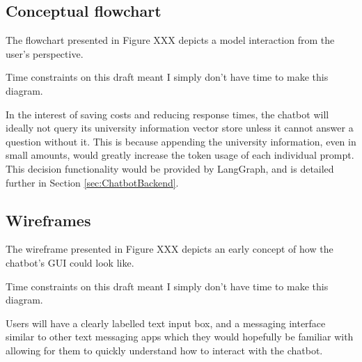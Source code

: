 



\subsection{Conceptual flowchart}
The flowchart presented in Figure XXX depicts a model interaction from the user's perspective.

\begin{tcolorbox}[colback=red!5!white,colframe=red!75!black,title=Not present in draft]
    Time constraints on this draft meant I simply don't have time to make this diagram.
\end{tcolorbox}

\noindent In the interest of saving costs and reducing response times, the chatbot will ideally not query its university information vector store 
unless it cannot answer a question without it. This is because appending the university information, even in small amounts, would 
greatly increase the token usage of each individual prompt. This decision functionality would be provided by LangGraph, and is detailed 
further in Section \ref{sec:ChatbotBackend}.

\subsection{Wireframes}
The wireframe presented in Figure XXX depicts an early concept of how the chatbot's GUI could look like.

\begin{tcolorbox}[colback=red!5!white,colframe=red!75!black,title=Not present in draft]
    Time constraints on this draft meant I simply don't have time to make this diagram.
\end{tcolorbox}

\noindent Users will have a clearly labelled text input box, and a messaging interface similar to other text messaging apps 
which they would hopefully be familiar with allowing for them to quickly understand how to interact with the chatbot.
